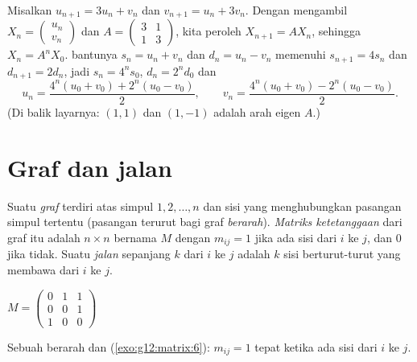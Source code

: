 \begin{example}\label{ex:g12:matrix:coupled}
Misalkan $u_{n+1} = 3u_n + v_n$ dan $v_{n+1} = u_n + 3v_n$. Dengan mengambil
$X_n = \begin{pmatrix} u_n\\ v_n \end{pmatrix}$ dan
$A = \begin{pmatrix} 3 & 1\\ 1 & 3\end{pmatrix}$, kita peroleh
$X_{n+1} = AX_n$, sehingga $X_n = A^n X_0$.  bantunya
$s_n = u_n + v_n$ dan $d_n = u_n - v_n$ memenuhi $s_{n+1} = 4s_n$ dan
$d_{n+1} = 2d_n$, jadi $s_n = 4^n s_0$, $d_n = 2^n d_0$ dan
\[
u_n = \frac{4^n(u_0+v_0) + 2^n(u_0-v_0)}{2}, \qquad
v_n = \frac{4^n(u_0+v_0) - 2^n(u_0-v_0)}{2}.
\]
(Di balik layarnya: $(1,1)$ dan $(1,-1)$ adalah arah  eigen $A$.)
\end{example}

\section{Graf dan jalan}

\begin{definition}\label{def:g12:matrix:graph}
Suatu \emph{graf} terdiri atas simpul $1, 2, \dots, n$ dan sisi
yang menghubungkan pasangan simpul tertentu (pasangan terurut bagi graf
\emph{berarah}). \emph{Matriks ketetanggaan} dari graf itu
adalah  $n \times n$ bernama $M$ dengan $m_{ij} = 1$ jika ada sisi dari $i$ ke
$j$, dan $0$ jika tidak. Suatu \emph{jalan} sepanjang $k$ dari $i$ ke $j$ adalah
 $k$ sisi berturut-turut yang membawa dari $i$ ke $j$.
\end{definition}

\begin{omfigure}
\qquad\qquad
$M = \begin{pmatrix} 0 & 1 & 1\\ 0 & 0 & 1\\ 1 & 0 & 0 \end{pmatrix}$

{\small Sebuah  berarah dan 
(\cref{exo:g12:matrix:6}): $m_{ij} = 1$ tepat ketika ada sisi
dari $i$ ke $j$.}
\end{omfigure}

